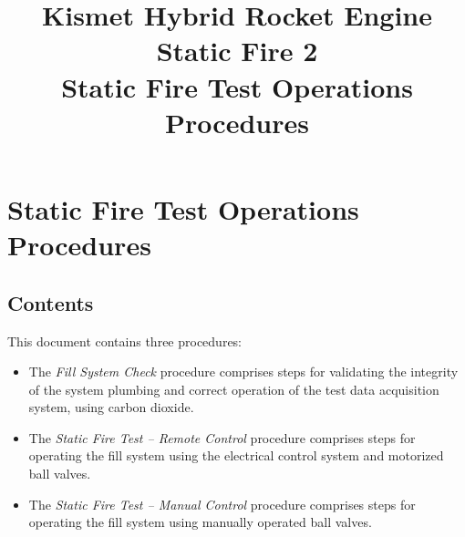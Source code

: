 

\title{
\Huge Kismet Hybrid Rocket Engine\\
Static Fire 2\\
\vspace{1cm}
\Large Static Fire Test Operations Procedures}





\section{Static Fire Test Operations Procedures}

\subsection{Contents}
This document contains three procedures:
\begin{itemize}
    \item The \textit{Fill System Check} procedure comprises steps for validating the integrity of the system plumbing and correct operation of the test data acquisition system, using carbon dioxide.
    \item The \textit{Static Fire Test – Remote Control} procedure comprises steps for operating the fill system using the electrical control system and motorized ball valves.
    \item The \textit{Static Fire Test – Manual Control} procedure comprises steps for operating the fill system using manually operated ball valves.
\end{itemize}

